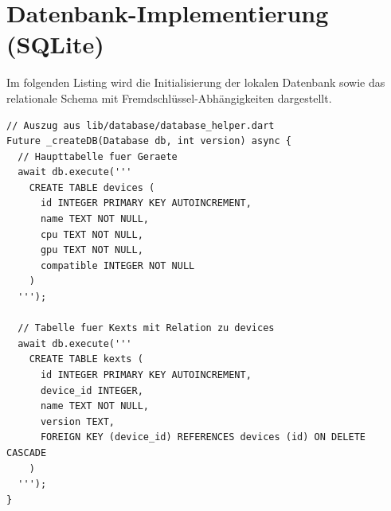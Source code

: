 




\section{Datenbank-Implementierung (SQLite)}
Im folgenden Listing wird die Initialisierung der lokalen Datenbank sowie das relationale Schema mit Fremdschlüssel-Abhängigkeiten dargestellt.

\begin{lstlisting}[caption={DatabaseHelper.dart – Relationales Schema und Initialisierung}]
// Auszug aus lib/database/database_helper.dart
Future _createDB(Database db, int version) async {
  // Haupttabelle fuer Geraete
  await db.execute('''
    CREATE TABLE devices (
      id INTEGER PRIMARY KEY AUTOINCREMENT,
      name TEXT NOT NULL,
      cpu TEXT NOT NULL,
      gpu TEXT NOT NULL,
      compatible INTEGER NOT NULL
    )
  ''');

  // Tabelle fuer Kexts mit Relation zu devices
  await db.execute('''
    CREATE TABLE kexts (
      id INTEGER PRIMARY KEY AUTOINCREMENT,
      device_id INTEGER,
      name TEXT NOT NULL,
      version TEXT,
      FOREIGN KEY (device_id) REFERENCES devices (id) ON DELETE CASCADE
    )
  ''');
}
\end{lstlisting}

